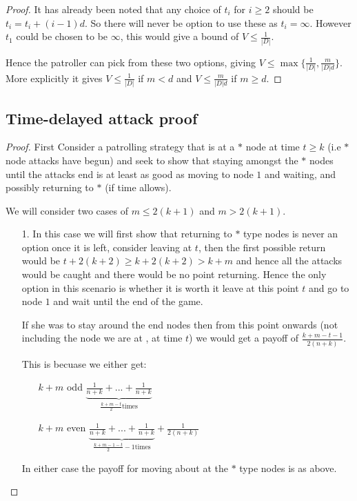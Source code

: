 \documentclass[a4paper,10pt]{article}
\theoremstyle{definition}
\theoremstyle{definition}
\theoremstyle{remark}
\theoremstyle{definition}
\begin{document}
\begin{proof}
It has already been noted that any choice of $t_{i}$ for $i \geq 2$ should be $t_{i}=t_{i}+(i-1)d$. So there will never be option to use these as $t_{i}=\infty$. However $t_{1}$ could be chosen to be $\infty$, this would give a bound of $V \leq \frac{1}{|D|}$.

Hence the patroller can pick from these two options, giving $V \leq \max \{ \frac{1}{|D|} , \frac{m}{|D|d} \}$. More explicitly it gives $V \leq \frac{1}{|D|}$ if $m < d$ and $V \leq \frac{m}{|D|d}$ if $m \geq d$.
\end{proof}

\subsection{Time-delayed attack proof}
\label{Time-delayed attack proof}
\begin{proof}
First Consider a patrolling strategy that is at a $*$ node at time $t \geq k$ (i.e $*$ node attacks have begun) and seek to show that staying amongst the $*$ nodes until the attacks end is at least as good as moving to node $1$ and waiting, and possibly returning to $*$ (if time allows).

We will consider two cases of $m \leq 2(k+1)$ and $m > 2(k+1)$.
\begin{itemize}
\item[1.] In this case we will first show that returning to $*$ type nodes is never an option once it is left, consider leaving at $t$, then the first possible return would be $t+2(k+2) \geq k + 2(k+2) > k+m$ and hence all the attacks would be caught and there would be no point returning. Hence the only option in this scenario is whether it is worth it leave at this point $t$ and go to node $1$ and wait until the end of the game.

If she was to stay around the end nodes then from this point onwards (not including the node we are at , at time $t$) we would get a payoff of $\frac{k+m-t-1}{2(n+k)}$.

This is becuase we either get:
\begin{itemize}
\item[$k+m$ odd] $\underbrace{\frac{1}{n+k}+...+\frac{1}{n+k}}_{\frac{k+m-t}{2} \text{times}}$
\item[$k+m$ even] $\underbrace{\frac{1}{n+k}+...+\frac{1}{n+k}}_{\frac{k+m-1-t}{2}-1 \text{times}} +\frac{1}{2(n+k)}$
\end{itemize}

In either case the payoff for moving about at the $*$ type nodes is as above.


\end{itemize}
\end{proof}
\end{document}
